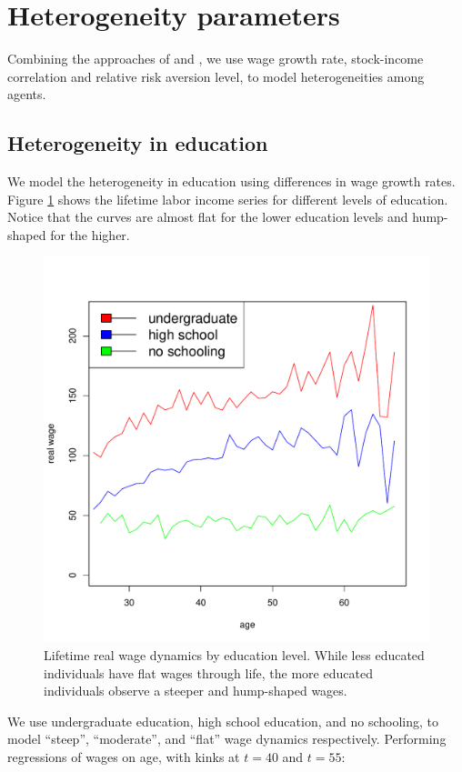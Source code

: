 \section{Heterogeneity parameters}
Combining the approaches of \citet{olear} and \citet{munk}, we use wage growth rate, stock-income correlation and relative risk aversion level, to model heterogeneities among agents.

\subsection{Heterogeneity in education}
We model the heterogeneity in education using differences in wage growth rates. Figure \ref{fig:wageeduc} shows the lifetime labor income series for different levels of education. Notice that the curves are almost flat for the lower education levels and hump-shaped for the higher.

\begin{figure}[h]
	\centering
	\includegraphics[scale=0.4]{figs/wage2educ.pdf}
	\caption{Lifetime real wage dynamics by education level. While less educated individuals have flat wages through life, the more educated individuals observe a steeper and hump-shaped wages.}
	\label{fig:wageeduc}
\end{figure}

We use undergraduate education, high school education, and no schooling, to model ``steep'', ``moderate'', and ``flat'' wage dynamics respectively. Performing regressions of wages on age, with kinks at $t=40$ and $t=55$:

